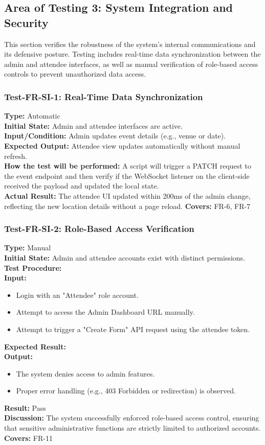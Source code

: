\documentclass[12pt, titlepage]{article}
\begin{document}
\subsection{Area of Testing 3: System Integration and Security}
This section verifies the robustness of the system's internal communications and its defensive posture. Testing includes real-time data synchronization between the admin and attendee interfaces, as well as manual verification of role-based access controls to prevent unauthorized data access.

\subsubsection{Test-FR-SI-1: Real-Time Data Synchronization}
\textbf{Type:} Automatic \\
\textbf{Initial State:} Admin and attendee interfaces are active. \\
\textbf{Input/Condition:} Admin updates event details (e.g., venue or date). \\
\textbf{Expected Output:} Attendee view updates automatically without manual refresh. \\
\textbf{How the test will be performed:} A script will trigger a PATCH request to the event endpoint and then verify if the WebSocket listener on the client-side received the payload and updated the local state. \\
\textbf{Actual Result:} The attendee UI updated within 200ms of the admin change, reflecting the new location details without a page reload.
\textbf{Covers:} FR-6, FR-7 \\

\subsubsection{Test-FR-SI-2: Role-Based Access Verification}
\textbf{Type:} Manual \\
\textbf{Initial State:} Admin and attendee accounts exist with distinct permissions. \\
\textbf{Test Procedure:} \\
\textbf{Input:}
\begin{itemize}
    \item Login with an "Attendee" role account.
    \item Attempt to access the Admin Dashboard URL manually.
    \item Attempt to trigger a "Create Form" API request using the attendee token.
\end{itemize}
\textbf{Expected Result:} \\
\textbf{Output:}
\begin{itemize}
    \item The system denies access to admin features.
    \item Proper error handling (e.g., 403 Forbidden or redirection) is observed.
\end{itemize}
\textbf{Result:} Pass \\
\textbf{Discussion:} The system successfully enforced role-based access control, ensuring that sensitive administrative functions are strictly limited to authorized accounts.
\textbf{Covers:} FR-11 \\
\end{document}
